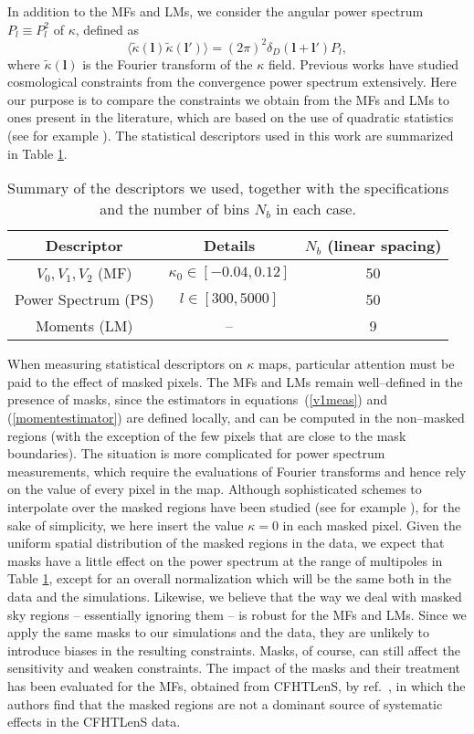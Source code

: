\documentclass[reprint,aps,prd,superscriptaddress,showkeys,showpacs]{revtex4-1}
\begin{document}
In addition to the MFs and LMs, we consider the angular power spectrum
$P_l\equiv P^2_l$ of $\kappa$, defined as
\begin{equation}
\label{powerspectrum}
\langle\tilde{\kappa}(\mathbf{l})\tilde{\kappa}(\mathbf{l}')\rangle=(2\pi)^2\delta_D(\mathbf{l}+\mathbf{l}')P_l,
\end{equation}  
where $\tilde{\kappa}(\mathbf{l})$ is the Fourier transform of the
$\kappa$ field. Previous works have studied cosmological constraints from
the convergence power spectrum extensively.  Here our purpose is to
compare the constraints we obtain from the MFs and LMs to ones present
in the literature, which are based on the use of quadratic statistics
(see for example \citep{CFHTKilbinger}). The statistical descriptors
used in this work are summarized in Table \ref{desctable}.
\begin{table}
\begin{tabular}{c|c|c} \hline
Descriptor & Details & $N_b$ (linear spacing) \\ \hline
$V_0,V_1,V_2$ (MF) & $\kappa_0\in[-0.04,0.12]$ & 50 \\
Power Spectrum (PS) & $l \in [300,5000]$ & 50 \\
Moments (LM) & -- & 9 \\
\end{tabular}
\caption{Summary of the descriptors we used, together with the specifications and the number of bins $N_b$ in each case.}
\label{desctable}
\end{table}

When measuring statistical descriptors on $\kappa$ maps, particular
attention must be paid to the effect of masked pixels. The MFs and LMs
remain well--defined in the presence of masks, since the estimators in
equations~(\ref{v1meas}) and (\ref{momentestimator}) are defined
locally, and can be computed in the non--masked regions (with the
exception of the few pixels that are close to the mask
boundaries). The situation is more complicated for power spectrum
measurements, which require the evaluations of Fourier transforms and
hence rely on the value of every pixel in the map. Although
sophisticated schemes to interpolate over the masked regions have been
studied (see for example \citep{VplasInterpolation}), for the sake of
simplicity, we here insert the value $\kappa=0$ in each masked pixel.
Given the uniform spatial distribution of the masked regions in the data, we expect that masks have a little effect on the power spectrum at the range of
multipoles in Table \ref{desctable}, except for an overall normalization which will be the same both in the data and the simulations.  
Likewise, we believe that the way we deal with masked sky regions --
essentially ignoring them -- is robust for the MFs and LMs. Since we
apply the same masks to our simulations and the data, they are
unlikely to introduce biases in the resulting constraints.  Masks, of
course, can still affect the sensitivity and weaken constraints. The
impact of the masks and their treatment has been evaluated for the
MFs, obtained from CFHTLenS, by ref.~\citep{CFHTMasato}, in which the authors find that the masked regions 
are not a dominant source of systematic effects in the CFHTLenS data. 
\end{document}
